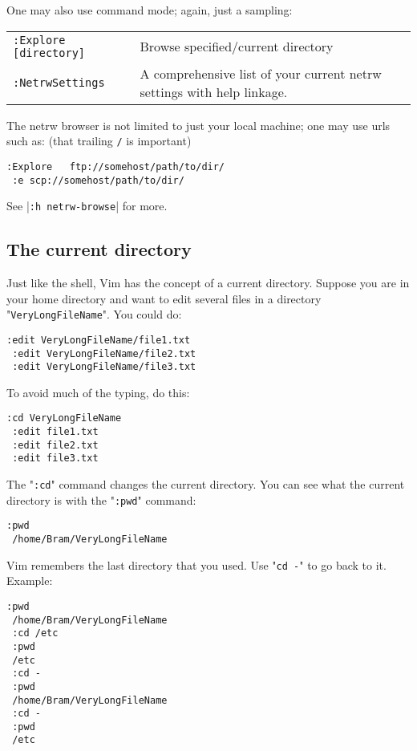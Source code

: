 One may also use command mode; again, just a sampling:

\begin{center} \begin{longtable}{l l}
				\verb!:Explore [directory]! & Browse specified/current directory \\
				\verb!:NetrwSettings! & A comprehensive list of your current netrw settings with help linkage.
\end{longtable} \end{center}

The netrw browser is not limited to just your local machine; one may use urls such as:
(that trailing \verb!/! is important)

\begin{Verbatim}[samepage=true]
 :Explore   ftp://somehost/path/to/dir/
 :e scp://somehost/path/to/dir/
\end{Verbatim}

See |\verb!:h netrw-browse!| for more.
\subsection{The current directory}

Just like the shell, Vim has the concept of a current directory.
Suppose you are in your home directory and want to edit several files in a directory "\verb!VeryLongFileName!".
You could do:

\begin{Verbatim}[samepage=true]
 :edit VeryLongFileName/file1.txt
 :edit VeryLongFileName/file2.txt
 :edit VeryLongFileName/file3.txt
\end{Verbatim}

To avoid much of the typing, do this:

\begin{Verbatim}[samepage=true]
 :cd VeryLongFileName
 :edit file1.txt
 :edit file2.txt
 :edit file3.txt
\end{Verbatim}

The "\verb!:cd!" command changes the current directory.
You can see what the current directory is with the "\verb!:pwd!" command:

\begin{Verbatim}[samepage=true]
 :pwd
 /home/Bram/VeryLongFileName
\end{Verbatim}

Vim remembers the last directory that you used.
Use "\verb!cd -!" to go back to it.
Example:

\begin{Verbatim}[samepage=true]
 :pwd
 /home/Bram/VeryLongFileName
 :cd /etc
 :pwd
 /etc
 :cd -
 :pwd
 /home/Bram/VeryLongFileName
 :cd -
 :pwd
 /etc
\end{Verbatim}

